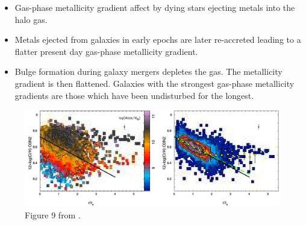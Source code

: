 \documentclass[11pt, a4paper, onecolumn]{article}
\begin{document}
\begin{multicols}{2}
\begin{itemize}
        \item Gas-phase metallicity gradient affect by dying stars ejecting
        metals into the halo gas. 

        \item Metals ejected from galaxies in early epochs are later
        re-accreted leading to a flatter present day gas-phase metallicity
        gradient.

        \item Bulge formation during galaxy mergers depletes the gas. The
        metallicity gradient is then flattened. Galaxies with the strongest
        gas-phase metallicity gradients are those which have been undisturbed
        for the longest.

    \end{itemize}




\end{multicols}
\begin{figure}[!ht]

    \includegraphics[scale=0.45]{figures/sanchez12_fig9.pdf}

    \caption{Figure 9 from \citet{sanchez12}.}

\end{figure}
\end{document}
